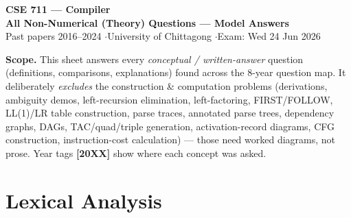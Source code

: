 \documentclass[12pt, a4paper]{article}
\newenvironment{notesbox}{\begin{mdframed}[style=notesframe]}{\end{mdframed}}
\newcommand{\yr}[1]{{\small\color{accent}\textbf{[#1]}}}
\begin{document}
\begin{center}
{\LARGE\bfseries\color{sectionblue} CSE 711 — Compiler}\\[4pt]
{\large\bfseries All Non-Numerical (Theory) Questions — Model Answers}\\[3pt]
{\small Past papers 2016--2024 \quad$\cdot$\quad University of Chittagong \quad$\cdot$\quad Exam: Wed 24 Jun 2026}
\end{center}

\begin{notesbox}
\small
\textbf{Scope.} This sheet answers every \emph{conceptual / written-answer} question (definitions, comparisons,
explanations) found across the 8-year question map. It deliberately \emph{excludes} the construction \&
computation problems (derivations, ambiguity demos, left-recursion elimination, left-factoring, FIRST/FOLLOW,
LL(1)/LR table construction, parse traces, annotated parse trees, dependency graphs, DAGs, TAC/quad/triple
generation, activation-record diagrams, CFG construction, instruction-cost calculation) — those need worked
diagrams, not prose. Year tags \yr{20XX} show where each concept was asked.
\end{notesbox}

\tableofcontents
\vspace{6pt}

\section{Lexical Analysis}
\end{document}
